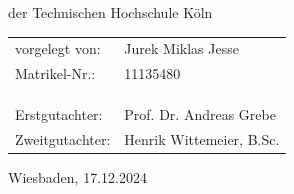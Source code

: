 \begin{titlepage}
    der Technischen Hochschule Köln
    \vfill
    \begin{tabular}{@{}ll}
        vorgelegt von:  & Jurek Miklas Jesse       \\
        Matrikel-Nr.:   & 11135480                 \\
        \\
        \\
        \\
        Erstgutachter:  & Prof. Dr. Andreas Grebe  \\
        Zweitgutachter: & Henrik Wittemeier, B.Sc.
    \end{tabular}
    \vfill
    Wiesbaden, 17.12.2024%
    \rmfamily%
\end{titlepage}